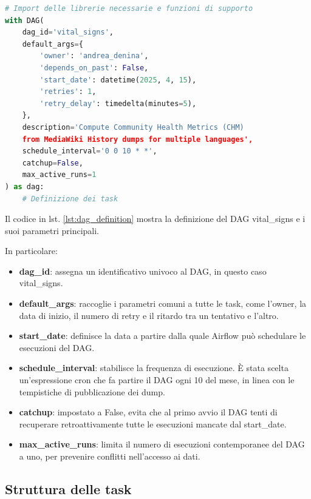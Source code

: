 \newpage

\begin{lstlisting}[language=Python, caption=Definizione del DAG in Airflow, label=lst:dag_definition]
# Import delle librerie necessarie e funzioni di supporto
with DAG(
    dag_id='vital_signs',
    default_args={
        'owner': 'andrea_denina',
        'depends_on_past': False,
        'start_date': datetime(2025, 4, 15),
        'retries': 1,
        'retry_delay': timedelta(minutes=5),
    },
    description='Compute Community Health Metrics (CHM) 
    from MediaWiki History dumps for multiple languages',
    schedule_interval='0 0 10 * *',
    catchup=False,
    max_active_runs=1
) as dag:
    # Definizione dei task
\end{lstlisting}

Il codice in lst. \ref{lst:dag_definition} mostra la definizione del DAG vital\_signs e i suoi parametri principali.

In particolare:

\begin{itemize}
    \item \textbf{dag\_id}: assegna un identificativo univoco al DAG, in questo caso vital\_signs.
    \item \textbf{default\_args}: raccoglie i parametri comuni a tutte le task, come l'owner, la data di inizio, il numero di retry e il ritardo tra un tentativo e l'altro.
    \item \textbf{start\_date}: definisce la data a partire dalla quale Airflow può schedulare le esecuzioni del DAG.
    \item \textbf{schedule\_interval}: stabilisce la frequenza di esecuzione. È stata scelta un'espressione cron che fa partire il DAG ogni 10 del mese, in linea con le tempistiche di pubblicazione dei dump.
    \item \textbf{catchup}: impostato a False, evita che al primo avvio il DAG tenti di recuperare retroattivamente tutte le esecuzioni mancate dal start\_date.
    \item \textbf{max\_active\_runs}: limita il numero di esecuzioni contemporanee del DAG a uno, per prevenire conflitti nell'accesso ai dati.
\end{itemize}


\subsection{Struttura delle task}
\label{subsec:struttura_task}

